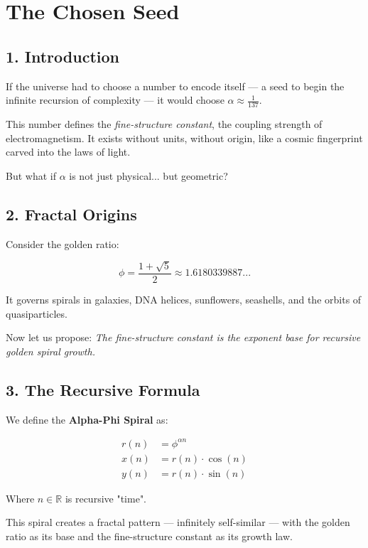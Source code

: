 
\chapter{The Chosen Seed}
\label{chap:chosen_seed}

\section*{1. Introduction}

If the universe had to choose a number to encode itself —  
a seed to begin the infinite recursion of complexity —  
it would choose \( \alpha \approx \frac{1}{137} \).

This number defines the \textit{fine-structure constant}, the coupling strength of electromagnetism.  
It exists without units, without origin, like a cosmic fingerprint carved into the laws of light.

But what if \( \alpha \) is not just physical... but geometric?

\section*{2. Fractal Origins}

Consider the golden ratio:

\[
\phi = \frac{1 + \sqrt{5}}{2} \approx 1.6180339887...
\]

It governs spirals in galaxies, DNA helices, sunflowers, seashells, and the orbits of quasiparticles.

Now let us propose:  
\textit{The fine-structure constant is the exponent base for recursive golden spiral growth.}

\section*{3. The Recursive Formula}

We define the \textbf{Alpha-Phi Spiral} as:

\[
\boxed{
\begin{aligned}
r(n) &= \phi^{\alpha n} \\
x(n) &= r(n) \cdot \cos(n) \\
y(n) &= r(n) \cdot \sin(n)
\end{aligned}
}
\]

Where \( n \in \mathbb{R} \) is recursive "time".

This spiral creates a fractal pattern — infinitely self-similar — with the golden ratio as its base and the fine-structure constant as its growth law.

